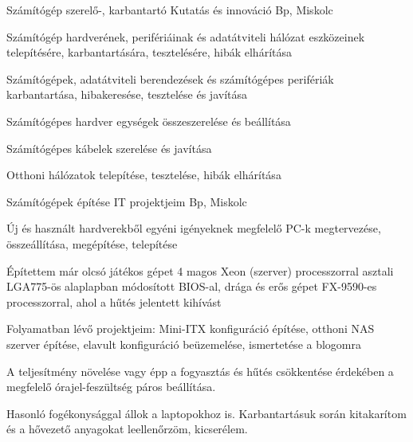 

\begin{cventries}

  \cventry
    {Számítógép szerelő-, karbantartó} %
    {Kutatás és innováció} %
    {Bp, Miskolc} %
    {} %
    {
      \begin{cvitems} %
        \item {Számítógép hardverének, perifériáinak és adatátviteli hálózat eszközeinek telepítésére, karbantartására, tesztelésére, hibák elhárítása}
        \item {Számítógépek, adatátviteli berendezések és számítógépes perifériák karbantartása, hibakeresése, tesztelése és javítása}
        \item {Számítógépes hardver egységek összeszerelése és beállítása}
        \item {Számítógépes kábelek szerelése és javítása}
        \item {Otthoni hálózatok telepítése, tesztelése, hibák elhárítása}
      \end{cvitems}
    }

  \cventry
    {Számítógépek építése} %
    {IT projektjeim} %
    {Bp, Miskolc} %
    {} %
    {
      \begin{cvitems} %
        \item {Új és használt hardverekből egyéni igényeknek megfelelő PC-k megtervezése, összeállítása, megépítése, telepítése}
        \item {Építettem már olcsó játékos gépet 4 magos Xeon (szerver) processzorral asztali LGA775-ös alaplapban módosított BIOS-al, drága és erős gépet FX-9590-es processzorral, ahol a hűtés jelentett kihívást}
        \item {Folyamatban lévő projektjeim: Mini-ITX konfiguráció építése, otthoni NAS szerver építése, elavult konfiguráció beüzemelése, ismertetése a blogomra}
        \item{A teljesítmény növelése vagy épp a fogyasztás és hűtés csökkentése érdekében a megfelelő órajel-feszültség páros beállítása.}
        \item {Hasonló fogékonysággal állok a laptopokhoz is. Karbantartásuk
        	során kitakarítom és a hővezető anyagokat leellenőrzöm, kicserélem.}
      \end{cvitems}
    }


\end{cventries}
